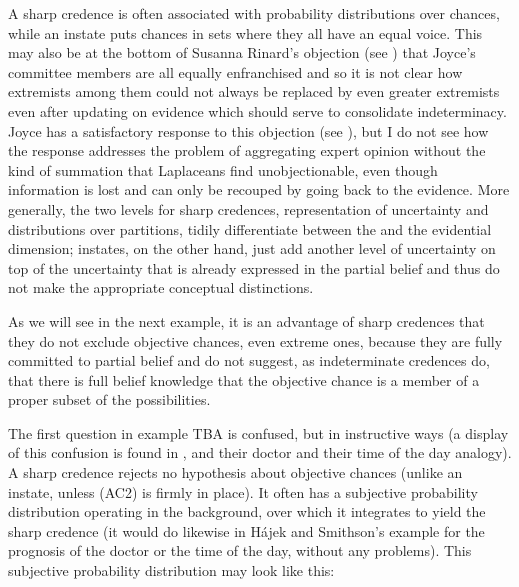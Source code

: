 \documentclass[11pt]{article}
\begin{document}
A sharp credence is often associated with probability distributions
over chances, while an instate puts chances in sets where they all
have an equal voice. This may also be at the bottom of Susanna
Rinard's objection (see ) that Joyce's
committee members are all equally enfranchised and so it is not clear
how extremists among them could not always be replaced by even greater
extremists even after updating on evidence which should serve to
consolidate indeterminacy. Joyce has a satisfactory response to this
objection (see ), but I do not see how the
response addresses the problem of aggregating expert opinion without
the kind of summation that Laplaceans find unobjectionable, even
though information is lost and can only be recouped by going back to
the evidence. More generally, the two levels for sharp credences,
representation of uncertainty and distributions over partitions,
tidily differentiate between the {\doxnotep} and the evidential
dimension; instates, on the other hand, just add another level of
uncertainty on top of the uncertainty that is already expressed in the
partial belief and thus do not make the appropriate conceptual
distinctions.

As we will see in the next example, it is an advantage of sharp
credences that they do not exclude objective chances, even extreme
ones, because they are fully committed to partial belief and do not
suggest, as indeterminate credences do, that there is full belief
knowledge that the objective chance is a member of a proper subset of
the possibilities.


The first question in example TBA\tbd{} is confused, but in
instructive ways (a display of this confusion is found in
, and their doctor and their time of
the day analogy). A sharp credence rejects no hypothesis about
objective chances (unlike an instate, unless (AC2) is firmly in place).
It often has a subjective probability distribution operating in the
background, over which it integrates to yield the sharp credence (it
would do likewise in H{\'a}jek and Smithson's example for the
prognosis of the doctor or the time of the day, without any problems).
This subjective probability distribution may look like this:
\end{document}
